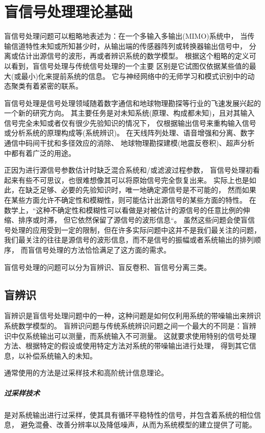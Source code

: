 ﻿%

\chapter{盲信号处理理论基础}
\label{chap01}

盲信号处理问题可以粗略地表述为：在一个多输入多输出(MIMO)系统中，
当传输信道特性未知或所知甚少时，从输出端的传感器阵列或转换器输出信号中，
分离或估计出源信号的波形，再或者辨识系统的数学模型。
根据这个粗略的定义可以看到，盲信号处理与传统信号处理的一个主要
区别是它试图仅依据某些值的最大(或最小)化来提前系统的信息。
它与神经网络中的无师学习和模式识别中的动态聚类有着紧密的联系。

盲信号处理是信号处理领域随着数字通信和地球物理勘探等行业的飞速发展兴起的一个新的研究方向。
其主要任务是对未知系统(原理、构成都未知)，且对其输入信号完全未知或者仅有很少先验知识的情况下，
仅根据输出信号来重构输入信号或分析系统的原理构成等(系统辨识)。
在天线阵列处理、语音增强和分离、数字通信中码间干扰和多径效应的消除、
地球物理勘探建模(地震反卷积)、超声分析中都有着广泛的用途。

正因为进行源信号参数估计时缺乏混合系统和/或滤波过程参数，
盲信号处理初看起来有些不可思议，也很难想像其可以将原始信号完全恢复出来。
实际上也是如此，在缺乏足够、必要的先验知识时，唯一地确定源信号是不可能的，
然而如果在某些方面允许不确定性和模糊性，则可能估计出源信号的某些方面的特性。
在数学上，“这种不确定性和模糊性可以看做是对被估计的源信号的任意比例的伸缩、排序或时滞，
但它依然保留了源信号的波形信息“。
虽然这些问题会使盲信号处理的应用受到一定的限制，但在许多实际问题中这并不是我们最关注的问题，
我们最关注的往往是源信号的波形信息，而不是信号的振幅或者系统输出的排列顺序，
而盲信号处理的方法恰恰满足了这方面的需求。

盲信号处理的问题可以分为盲辨识、盲反卷积、盲信号分离三类。

\section{盲辨识}
盲辨识是盲信号处理问题中的一种，这种问题是如何仅利用系统的带噪输出来辨识系统数学模型的。
盲辨识问题与传统系统辨识问题之间一个最大的不同是：盲辨识中仅系统输出可以测量，而系统输入不可测量。
这就要求使用特别的信号处理方法、根据特定的假设或使用特定方法对系统的带噪输出进行处理，
得到其它信息，以补偿系统输入的未知。

通常使用的方法是过采样技术和高阶统计信息理论。
\paragraph*{过采样技术}
是对系统输出进行过采样，使其具有循环平稳特性的信号，并包含着系统的相位信息，
避免混叠、改善分辨率以及降低噪声，从而为系统模型的建立提供了可能。

